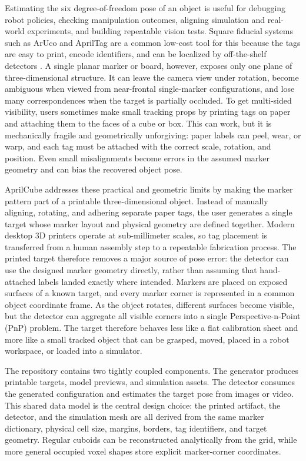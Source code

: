 \documentclass[conference]{IEEEtran}
\begin{document}
Estimating the six degree-of-freedom pose of an object is useful for debugging robot policies, checking manipulation outcomes, aligning simulation and real-world experiments, and building repeatable vision tests. Square fiducial systems such as ArUco and AprilTag are a common low-cost tool for this because the tags are easy to print, encode identifiers, and can be localized by off-the-shelf detectors \cite{aruco,apriltag}. A single planar marker or board, however, exposes only one plane of three-dimensional structure. It can leave the camera view under rotation, become ambiguous when viewed from near-frontal single-marker configurations, and lose many correspondences when the target is partially occluded. To get multi-sided visibility, users sometimes make small tracking props by printing tags on paper and attaching them to the faces of a cube or box. This can work, but it is mechanically fragile and geometrically unforgiving: paper labels can peel, wear, or warp, and each tag must be attached with the correct scale, rotation, and position. Even small misalignments become errors in the assumed marker geometry and can bias the recovered object pose.

AprilCube addresses these practical and geometric limits by making the marker pattern part of a printable three-dimensional object. Instead of manually aligning, rotating, and adhering separate paper tags, the user generates a single target whose marker layout and physical geometry are defined together. Modern desktop 3D printers operate at sub-millimeter scales, so tag placement is transferred from a human assembly step to a repeatable fabrication process. The printed target therefore removes a major source of pose error: the detector can use the designed marker geometry directly, rather than assuming that hand-attached labels landed exactly where intended. Markers are placed on exposed surfaces of a known target, and every marker corner is represented in a common object coordinate frame. As the object rotates, different surfaces become visible, but the detector can aggregate all visible corners into a single Perspective-n-Point (PnP) problem. The target therefore behaves less like a flat calibration sheet and more like a small tracked object that can be grasped, moved, placed in a robot workspace, or loaded into a simulator.

The repository contains two tightly coupled components. The generator produces printable targets, model previews, and simulation assets. The detector consumes the generated configuration and estimates the target pose from images or video. This shared data model is the central design choice: the printed artifact, the detector, and the simulation mesh are all derived from the same marker dictionary, physical cell size, margins, borders, tag identifiers, and target geometry. Regular cuboids can be reconstructed analytically from the grid, while more general occupied voxel shapes store explicit marker-corner coordinates.
\end{document}
